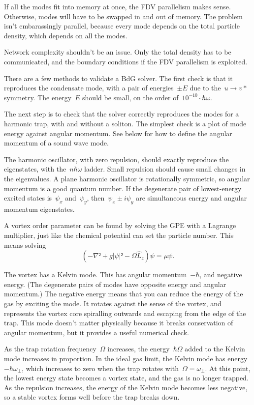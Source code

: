 If all the modes fit into memory at once, the FDV parallelism makes
sense.  Otherwise, modes will have to be swapped in and out of
memory.  The problem isn't embarassingly parallel, because every
mode depends on the total particle density, which depends on all
the modes.

Network complexity shouldn't be an issue.  Only the total density
has to be communicated, and the boundary conditions if the FDV
parallelism is exploited.


There are a few methods to validate a BdG solver.  The first check
is that it reproduces the condensate mode, with a pair of energies~$±E$
due to the~$u→v*$ symmetry.  The energy~$E$ should be small, on the
order of~$10^{-10}·ℏω$.

The next step is to check that the solver correctly reproduces the
modes for a harmonic trap, with and without a soliton.  The simplest
check is a plot of mode energy against angular momentum.  See below for how to define the angular momentum of a sound wave mode.

The harmonic oscillator, with zero repulsion, should exactly reproduce
the eigenstates, with the~$nℏω$ ladder.  Small repulsion should cause small changes
in the eigenvalues.  A plane harmonic oscillator is rotationally symmetric, so angular momentum is a good quantum number.  If the degenerate pair of lowest-energy excited states is~$ψ_x$ and~$ψ_y$, then~$ψ_x±iψ_y$ are simultaneous energy and angular momentum eigenstates.

A vortex order parameter can be found by solving the GPE with a
Lagrange multiplier, just like the chemical potential can set the
particle number.  This means solving
$$(-∇²+g|ψ|²-Ω\hat L_z)ψ=μψ.$$

The vortex has a Kelvin mode.  This has angular momentum~$-ℏ$, and
negative energy.  (The degenerate pairs of modes have opposite
energy and angular momentum.)  The negative energy means that you
can reduce the energy of the gas by exciting the mode.  It rotates
against the sense of the vortex, and represents the vortex core
spiralling outwards and escaping from the edge of the trap.  This
mode doesn't matter physically because it breaks conservation of
angular momentum, but it provides a useful numerical check.

As the trap rotation frequency~$Ω$ increases, the energy~$ℏΩ$ added to the Kelvin mode increases in proportion.  In the ideal gas limit, the Kelvin mode has energy~$-ℏω_\perp$, which increases to zero when the trap rotates with~$Ω=ω_\perp$.  At this point, the lowest energy state becomes a vortex state, and the gas is no longer trapped.  As the repulsion increases, the energy of the Kelvin mode becomes less negative, so a stable vortex forms well before the trap breaks down.

